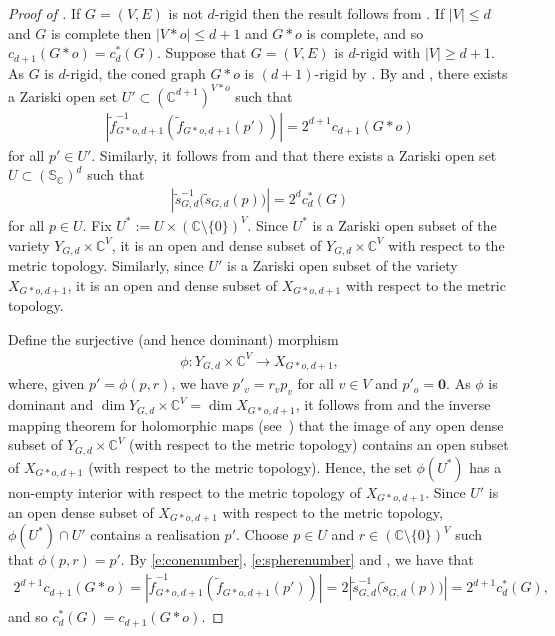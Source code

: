 \documentclass[ALCO]{cedram}
\begin{document}
\begin{proof}[Proof of ]
	If $G=(V,E)$ is not $d$-rigid then the result follows from .
	If $|V| \leq d$ and $G$ is complete then $|V*o| \leq d+1$ and $G*o$ is complete,
	and so $c_{d+1}(G*o) = c^*_d(G)$.
	Suppose that $G=(V,E)$ is $d$-rigid with $|V| \geq d+1$.	
	As $G$ is $d$-rigid, the coned graph $G*o$ is $(d+1)$-rigid by .
	By  and ,
	there exists a Zariski open set $U' \subset (\mathbb{C}^{d+1})^{V*o}$ such that
	\begin{align}\label{e:conenumber}
		\left| \tilde{f}_{G*o,d+1}^{-1} \left(\tilde{f}_{G*o,d+1}(p') \right) \right| = 2^{d+1} c_{d+1}(G*o)
	\end{align}
	for all $p' \in U'$.
	Similarly, it follows from  and  that there exists a Zariski open set $U \subset (\mathbb{S}_\mathbb{C})^{d}$ such that
	\begin{align}\label{e:spherenumber}
		\left| \tilde{s}_{G,d}^{-1} \Big(\tilde{s}_{G,d}(p) \Big) \right| = 2^{d} c_{d}^*(G)
	\end{align}
	for all $p \in U$.
	Fix $U^* := U \times (\mathbb{C} \setminus \{0\})^V$.
	Since $U^*$ is a Zariski open subset of the variety $Y_{G,d} \times \mathbb{C}^V$,
	it is an open and dense subset of $Y_{G,d} \times \mathbb{C}^V$ with respect to the metric topology.
	Similarly,
	since $U'$ is a Zariski open subset of the variety $ X_{G *o,d+1}$,
	it is an open and dense subset of $X_{G *o,d+1}$ with respect to the metric topology.
	
	Define the surjective (and hence dominant) morphism 
	\begin{align*}
		\phi : Y_{G,d} \times \mathbb{C}^V \rightarrow X_{G *o,d+1},
	\end{align*}
	where, given $p'= \phi(p,r)$,
	we have $p'_v=r_vp_v$ for all $v \in V$ and $p'_o=\mathbf{0}$.
	As $\phi$ is dominant and $\dim Y_{G,d} \times \mathbb{C}^V = \dim X_{G *o,d+1}$,
	it follows from  and the inverse mapping theorem for holomorphic maps (see~\cite[Theorem 7.5]{FG02}) that the image of any open dense subset of $Y_{G,d} \times \mathbb{C}^V$ (with respect to the metric topology) contains an open subset of $X_{G*o,d+1}$ (with respect to the metric topology).
	Hence, the set $\phi( U^*)$ has a non-empty interior with respect to the metric topology of $X_{G*o,d+1}$.
	Since $U'$ is an open dense subset of $X_{G*o,d+1}$ with respect to the metric topology,
	$\phi( U^*) \cap U'$ contains a realisation $p'$.
	Choose $p \in U$ and $r \in (\mathbb{C}\setminus \{0\})^V$ such that $\phi(p,r) = p'$.
	By \eqref{e:conenumber}, \eqref{e:spherenumber} and ,
	we have that
	\begin{align*}
		2^{d+1} c_{d+1}(G*o) =\left| \tilde{f}_{G*o,d+1}^{-1}\left(\tilde{f}_{G*o,d+1}(p') \right) \right| = 2 \left| \tilde{s}_{G,d}^{-1}\Big(\tilde{s}_{G,d}(p) \Big) \right|= 2^{d+1} c^*_{d}(G),
	\end{align*}
	and so $c^*_{d}(G) = c_{d+1}(G*o)$.
\end{proof}
\end{document}
